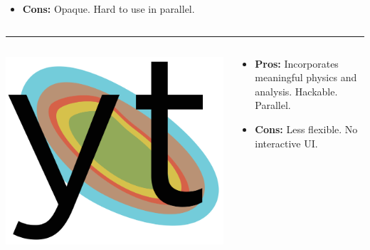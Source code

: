 \documentclass[]{beamer}
\begin{document}
\begin{frame}
\begin{columns}
\begin{column}{6cm}
\begin{itemize}
      \item \textbf{\color{red}Cons:} Opaque. Hard to use in parallel.
      \end{itemize}
    \end{column}
  \end{columns}
  \noindent\rule{\textwidth}{1pt}
  \begin{columns}
    \begin{column}{6cm}
      \begin{center}
        \includegraphics[width=0.4\columnwidth]{figures/yt_logo}
      \end{center}
    \end{column}
    \begin{column}{6cm}
      \begin{itemize}
      \item \textbf{\color{green}Pros:} Incorporates meaningful
        physics and analysis. Hackable. Parallel.
      \item \textbf{\color{red}Cons:} Less flexible. No interactive UI.
      \end{itemize}
    \end{column}
  \end{columns}
\end{frame}
\end{document}
